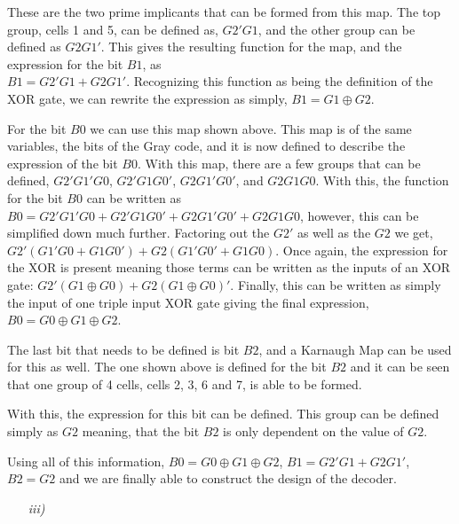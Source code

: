 \documentclass[12pt]{article}
\begin{document}
\par These are the two prime implicants that can be formed from this map. The
top group, cells 1 and 5, can be defined as, $G2'G1$, and the other group can be
defined as $G2G1'$. This gives the resulting function for the map, and the
expression for the bit $B1$, as \\ $B1 = G2'G1 + G2G1'$. Recognizing this function
as being the definition of the XOR gate, we can rewrite the expression as
simply, $B1 = G1 \oplus G2$.
\begin{center}
\end{center}
\par For the bit $B0$ we can use this map shown above. This map is of the same
variables, the bits of the Gray code, and it is now defined to describe the
expression of the bit $B0$. With this map, there are a few groups that can be
defined, $G2'G1'G0$, $G2'G1G0'$, $G2G1'G0'$, and $G2G1G0$. With this, the
function for the bit $B0$ can be written as $B0 = G2'G1'G0 + G2'G1G0' + G2G1'G0'
+ G2G1G0$, however, this can be simplified down much further. Factoring out the
$G2'$ as well as the $G2$ we get, $G2'(G1'G0+G1G0') + G2(G1'G0'+G1G0)$. Once
again, the expression for the XOR is present meaning those terms can be written
as the inputs of an XOR gate: $ G2'(G1 \oplus G0) + G2(G1 \oplus G0)'$. Finally,
this can be written as simply the input of one triple input XOR gate giving the
final expression, $B0 = G0 \oplus G1 \oplus G2$.
\begin{center}
\end{center}
\par The last bit that needs to be defined is bit $B2$, and a Karnaugh Map can
be used for this as well. The one shown above is defined for the bit $B2$ and it
can be seen that one group of 4 cells, cells 2, 3, 6 and 7, is able to be formed.
\begin{center}
\end{center}
\par With this, the expression for this bit can be defined. This group can be
defined simply as $G2$ meaning, that the bit $B2$ is only dependent on the value
of $G2$.
\par Using all of this information, $B0 = G0 \oplus G1 \oplus G2$, $B1 = G2'G1 +
G2G1'$, $B2 = G2$ and  we are finally able to construct the design of the
decoder.
\newpage
\begin{itemize}
    \item[\textit{iii)}]
\end{itemize}
\end{document}
